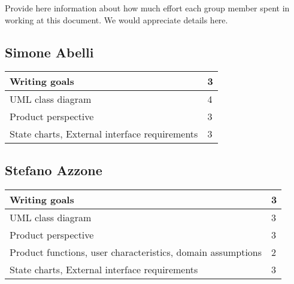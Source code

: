 Provide here information about how much effort each group member spent in working at this document. We would appreciate details here.\\

\subsection{Simone Abelli}
\begin{tabular} { | m{5cm} | m{1cm} | }
	\hline
	Writing goals & 3\\
	\hline
	UML class diagram & 4\\
	\hline
	Product perspective & 3\\
	\hline
	State charts, External interface requirements & 3\\
	\hline
\end{tabular}

\subsection{Stefano Azzone}
\begin{tabular} { | m{5cm} | m{1cm} | }
	\hline
	Writing goals & 3\\
	\hline
	UML class diagram & 3\\
	\hline
	Product perspective & 3\\
	\hline
	Product functions, user characteristics, domain assumptions & 2\\
	\hline
	State charts, External interface requirements & 3\\
	\hline
\end{tabular}